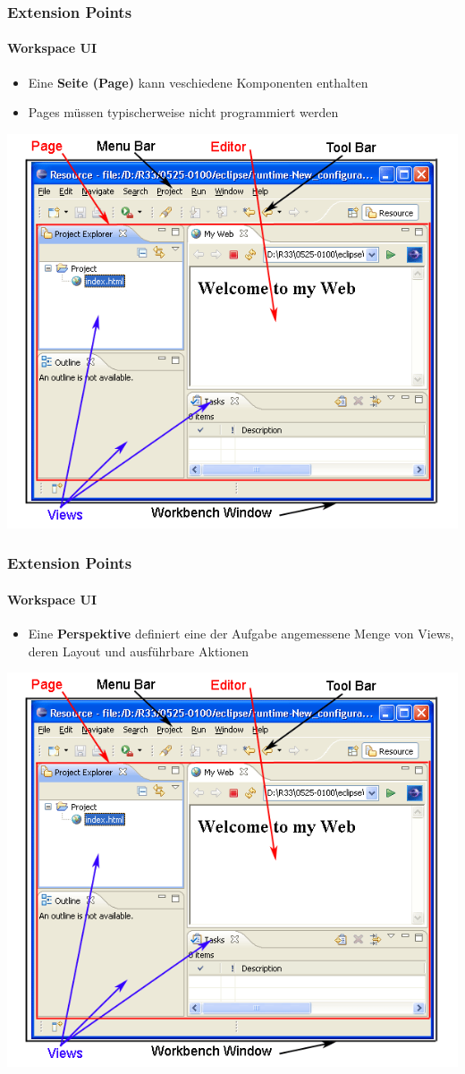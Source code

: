 {\begin{frame}
  \frametitle{Extension Points}
  \framesubtitle{Workspace UI}
  \begin{itemize}
    \item Eine \textbf{Seite (Page)} kann veschiedene Komponenten enthalten
    \item Pages müssen typischerweise nicht programmiert werden
  \end{itemize}
  \includegraphics[scale=0.3]{images/workspace-ui.png}  
\end{frame}

\begin{frame}
  \frametitle{Extension Points}
  \framesubtitle{Workspace UI}
  \begin{itemize}
    \item Eine \textbf{Perspektive} definiert eine der Aufgabe angemessene Menge von Views, deren Layout und ausführbare Aktionen
  \end{itemize}
  \includegraphics[scale=0.3]{images/workspace-ui.png}  
\end{frame}

}
